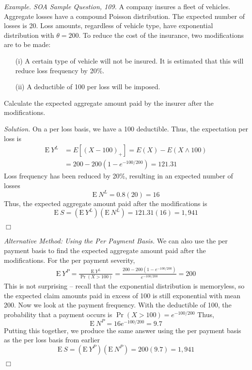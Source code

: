 \documentclass[12pt,letterpaper]{article}
\begin{document}
\noindent \textit{Example. SOA Sample Question, 109.} A company insures a fleet of vehicles. Aggregate losses have a compound Poisson distribution. The expected number of losses is 20. Loss amounts, regardless of vehicle type, have exponential distribution with $\theta=200$. To reduce the cost of the insurance, two modifications are to be made:
\begin{enumerate}
	\item[(i)] A certain type of vehicle will not be insured. It is estimated that this will reduce loss frequency by 20\%.
	\item[(ii)] A deductible of 100 per loss will be imposed.
\end{enumerate}
Calculate the expected aggregate amount paid by the insurer after the modifications.

\bigskip

\noindent \textit{Solution.} On a per loss basis, we have a 100 deductible. Thus, the expectation per loss is
\begin{align*}
\mathrm{E~} Y^L &= E[(X-100)_+] = E(X) - E(X\wedge 100) \\
&= 200 - 200(1-e^{-100/200}) = 121.31
\end{align*}
Loss frequency has been reduced by 20\%, resulting in an expected number of losses
$$\mathrm{E~}N^L = 0.8(20) = 16$$
Thus, the expected aggregate amount paid after the modifications is
$$\mathrm{E~}S = \left(\mathrm{E~}Y^L \right) \left( \mathrm{E~} N^L\right) = 121.31(16) = 1,941$$
\begin{flushright}$\Box$\end{flushright}
\textit{Alternative Method: Using the Per Payment Basis.} We can also use the per payment basis to find the expected aggregate amount paid after the modifications. For the per payment severity,
\begin{align*}
\mathrm{E~} Y^P = \frac{\mathrm{E~} Y^L}{\Pr(X > 100)} = \frac{200 - 200(1-e^{-100/200})}{e^{-100/200}} = 200
\end{align*}
This is not surprising -- recall that the exponential distribution is memoryless, so the expected claim amounts paid in excess of 100 is still exponential with mean 200. Now we look at the payment frequency. With the deductible of 100, the probability that a payment occurs is $\Pr(X > 100) = e^{-100/200}$ Thus,
$$\mathrm{E~} N^P = 16 e^{-100/200} = 9.7$$
Putting this together, we produce the same answer using the per payment basis as the per loss basis from earlier
$$\mathrm{E~}S = \left( \mathrm{E~} Y^P \right) \left( \mathrm{E~} N^P \right) = 200(9.7) = 1,941$$
\begin{flushright}$\Box$\end{flushright}
\end{document}
